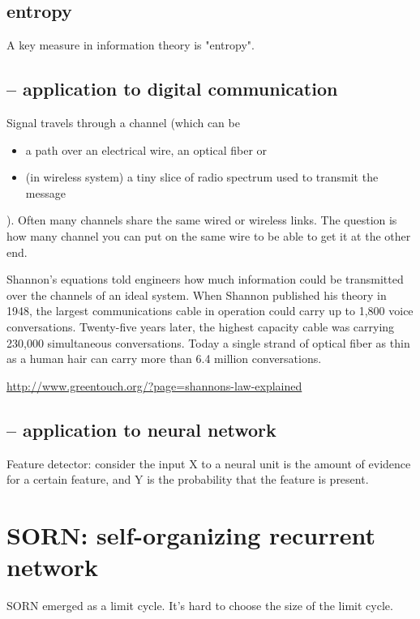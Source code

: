 \subsection{entropy}

A key measure in information theory is "entropy".

\subsection{-- application to digital communication}

Signal travels through a channel (which can be
\begin{itemize}
  \item  a path over an electrical wire, an optical fiber or 
  \item  (in wireless system) a tiny slice of radio spectrum used to transmit
  the message
\end{itemize}
). Often many channels share the same wired or wireless links. The question is
how many channel you can put on the same wire to be able to get it at the other
end.

Shannon's equations told engineers how much information could be transmitted
over the channels of an ideal system. When Shannon published his theory in 1948,
the largest communications cable in operation could carry up to 1,800 voice
conversations. Twenty-five years later, the highest capacity cable was carrying
230,000 simultaneous conversations.
Today a single strand of optical fiber as thin as a human hair can carry more
than 6.4 million conversations.

\url{http://www.greentouch.org/?page=shannons-law-explained}


\subsection{-- application to neural network}

Feature detector: consider the input X to a neural unit 
is the amount of evidence for a certain
feature, and Y is the probability that the feature is present.

\section{SORN: self-organizing recurrent network}
\label{sec:SORN}

SORN emerged as a limit cycle. It's hard to choose the size of the limit cycle.

